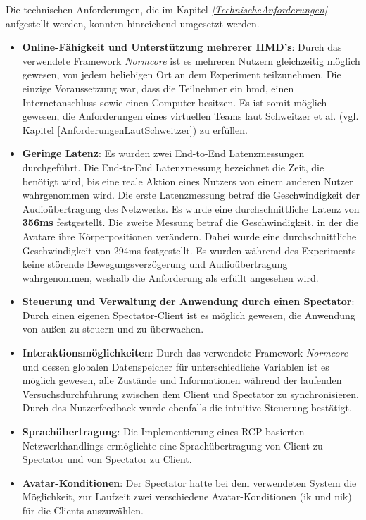 \documentclass[a4paper,11pt]{article}%
\renewcommand{\\}{\vspace*{0.5\baselineskip} \newline}
\begin{document}
{{Die technischen Anforderungen, die im Kapitel \textit{\ref{TechnischeAnforderungen}} aufgestellt werden, konnten hinreichend umgesetzt werden.
\begin{itemize}
\item \textbf{Online-Fähigkeit und Unterstützung mehrerer HMD's}: Durch das verwendete Framework \textit{Normcore} ist es mehreren Nutzern gleichzeitig möglich gewesen, von jedem beliebigen Ort an dem Experiment teilzunehmen. Die einzige Voraussetzung war, dass die Teilnehmer ein \ac{hmd}, einen Internetanschluss sowie einen Computer besitzen. Es ist somit möglich gewesen, die Anforderungen eines virtuellen Teams laut Schweitzer et al. \citep[S. 270]{schweitzer2010conceptualizing} (vgl. Kapitel \ref{AnforderungenLautSchweitzer}) zu erfüllen. 
\item \textbf{Geringe Latenz}: Es wurden zwei End-to-End Latenzmessungen durchgeführt. Die End-to-End Latenzmessung bezeichnet die Zeit, die benötigt wird, bis eine reale Aktion eines Nutzers von einem anderen Nutzer wahrgenommen wird. Die erste Latenzmessung betraf die Geschwindigkeit der Audioübertragung des Netzwerks. Es wurde eine durchschnittliche Latenz von \textbf{356ms} festgestellt.
Die zweite Messung betraf die Geschwindigkeit, in der die Avatare ihre Körperpositionen verändern. Dabei wurde eine durchschnittliche Geschwindigkeit von 294ms festgestellt.
Es wurden während des Experiments keine störende Bewegungsverzögerung und Audioübertragung wahrgenommen, weshalb die Anforderung als erfüllt angesehen wird.
\item \textbf{Steuerung und Verwaltung der Anwendung durch einen Spectator}: Durch einen eigenen Spectator-Client ist es möglich gewesen, die Anwendung von außen zu steuern und zu überwachen.
\item \textbf{Interaktionsmöglichkeiten}:  Durch das verwendete Framework \textit{Normcore} und dessen globalen Datenspeicher für unterschiedliche Variablen ist es möglich gewesen, alle Zustände und Informationen während der laufenden Versuchsdurchführung zwischen dem Client und Spectator zu synchronisieren. Durch das Nutzerfeedback wurde ebenfalls die intuitive Steuerung bestätigt.
\item \textbf{Sprachübertragung}: Die Implementierung eines RCP-basierten Netzwerkhandlings ermöglichte eine Sprachübertragung von Client zu Spectator und von Spectator zu Client.
\item \textbf{Avatar-Konditionen}: Der Spectator hatte bei dem verwendeten System die Möglichkeit, zur Laufzeit zwei verschiedene Avatar-Konditionen (\ac{ik} und \ac{nik}) für die Clients auszuwählen.

\end{itemize}}}
\end{document}
